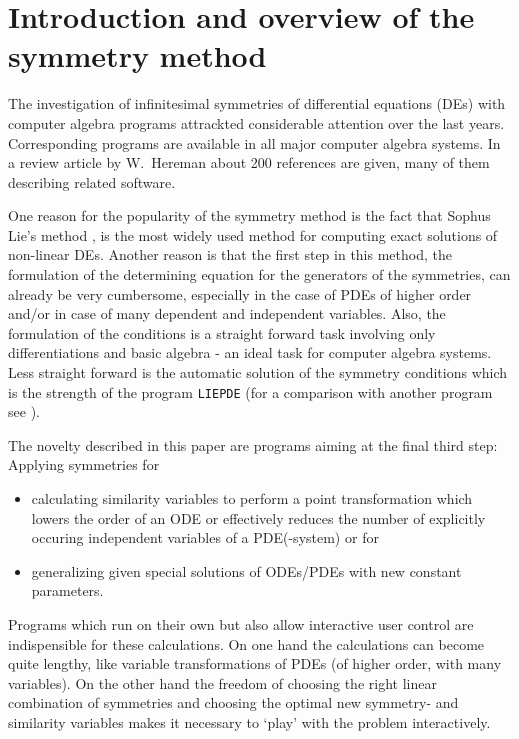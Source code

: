 \tableofcontents
\section{Introduction and overview of the symmetry method}
The investigation of infinitesimal symmetries of differential equations
(DEs) with computer algebra programs attrackted considerable attention
over the last years. Corresponding programs are available in all
major computer algebra systems. In a review article by W.\ Hereman
\cite{WHer} about 200 references are given, many of them describing related
software.

One reason for the popularity of the symmetry method
is the fact that Sophus Lie's method
\cite{lie1},\cite{lie2} is the most widely
used method for computing exact solutions of non-linear DEs. Another reason is
that the first step in this
method, the formulation of the determining equation for the generators
of the symmetries, can already be very cumbersome, especially in the
case of PDEs of higher order and/or in case of many dependent and independent
variables. Also, the formulation of the conditions is a straight forward
task involving only differentiations and basic algebra - an ideal task for
computer algebra systems. Less straight forward is the automatic solution
of the symmetry conditions which is the strength of the program {\tt LIEPDE}
(for a comparison with another program see \cite{LIEPDE}).

The novelty described in this paper are programs aiming at
the final third step: Applying symmetries for
\begin{itemize}
\item calculating similarity variables to perform a point transformation
which lowers the order of an ODE or effectively reduces the number of
explicitly occuring independent variables of a PDE(-system) or for
\item generalizing given special solutions of ODEs/PDEs with new constant
parameters.
\end{itemize}
Programs which run on their own but also allow interactive user control
are indispensible for these calculations. On one hand the calculations can
become quite lengthy, like variable transformations of PDEs (of higher order,
with many variables). On the other hand the freedom of choosing the right
linear combination of symmetries and choosing the optimal new symmetry- and
similarity variables makes it necessary to `play' with the problem
interactively.

